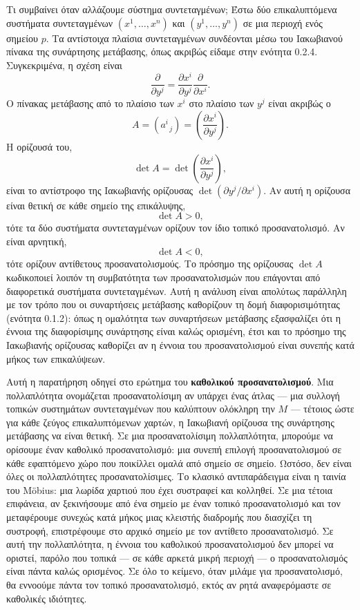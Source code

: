 \documentclass[12pt]{article}
\begin{document}
Τι συμβαίνει όταν αλλάζουμε σύστημα συντεταγμένων; Έστω δύο επικαλυπτόμενα συστήματα συντεταγμένων $(x^1, \dots, x^n)$ και $(y^1, \dots, y^n)$ σε μια περιοχή ενός σημείου $p$. Τα αντίστοιχα πλαίσια συντεταγμένων συνδέονται μέσω του Ιακωβιανού πίνακα της συνάρτησης μετάβασης, όπως ακριβώς είδαμε στην ενότητα 0.2.4. Συγκεκριμένα, η σχέση είναι
\[
\frac{\partial}{\partial y^j} = \frac{\partial x^i}{\partial y^j} \frac{\partial}{\partial x^i}.
\]
Ο πίνακας μετάβασης από το πλαίσιο των $x^i$ στο πλαίσιο των $y^j$ είναι ακριβώς ο
\[
A = (a^i_{\;\; j}) = \left( \frac{\partial x^i}{\partial y^j} \right).
\]
Η ορίζουσά του,
\[
\det A = \det \left( \frac{\partial x^i}{\partial y^j} \right),
\]
είναι το αντίστροφο της Ιακωβιανής ορίζουσας $\det(\partial y^j / \partial x^i)$. Αν αυτή η ορίζουσα είναι θετική σε κάθε σημείο της επικάλυψης,
\[
\det A > 0,
\]
τότε τα δύο συστήματα συντεταγμένων ορίζουν τον ίδιο τοπικό προσανατολισμό. Αν είναι αρνητική,
\[
\det A < 0,
\]
τότε ορίζουν αντίθετους προσανατολισμούς. Το πρόσημο της ορίζουσας $\det A$ κωδικοποιεί λοιπόν τη συμβατότητα των προσανατολισμών που επάγονται από διαφορετικά συστήματα συντεταγμένων. Αυτή η ανάλυση είναι απολύτως παράλληλη με τον τρόπο που οι συναρτήσεις μετάβασης καθορίζουν τη δομή διαφορισιμότητας (ενότητα 0.1.2): όπως η ομαλότητα των συναρτήσεων μετάβασης εξασφαλίζει ότι η έννοια της διαφορίσιμης συνάρτησης είναι καλώς ορισμένη, έτσι και το πρόσημο της Ιακωβιανής ορίζουσας καθορίζει αν η έννοια του προσανατολισμού είναι συνεπής κατά μήκος των επικαλύψεων.

Αυτή η παρατήρηση οδηγεί στο ερώτημα του \textbf{καθολικού προσανατολισμού}. Μια πολλαπλότητα ονομάζεται προσανατολίσιμη αν υπάρχει ένας άτλας --- μια συλλογή τοπικών συστημάτων συντεταγμένων που καλύπτουν ολόκληρη την $M$ --- τέτοιος ώστε για κάθε ζεύγος επικαλυπτόμενων χαρτών, η Ιακωβιανή ορίζουσα της συνάρτησης μετάβασης να είναι θετική. Σε μια προσανατολίσιμη πολλαπλότητα, μπορούμε να ορίσουμε έναν καθολικό προσανατολισμό: μια συνεπή επιλογή προσανατολισμού σε κάθε εφαπτόμενο χώρο που ποικίλλει ομαλά από σημείο σε σημείο. Ωστόσο, δεν είναι όλες οι πολλαπλότητες προσανατολίσιμες. Το κλασικό αντιπαράδειγμα είναι η ταινία του Möbius: μια λωρίδα χαρτιού που έχει συστραφεί και κολληθεί. Σε μια τέτοια επιφάνεια, αν ξεκινήσουμε από ένα σημείο με έναν τοπικό προσανατολισμό και τον μεταφέρουμε συνεχώς κατά μήκος μιας κλειστής διαδρομής που διασχίζει τη συστροφή, επιστρέφουμε στο αρχικό σημείο με τον αντίθετο προσανατολισμό. Σε αυτή την πολλαπλότητα, η έννοια του καθολικού προσανατολισμού δεν μπορεί να οριστεί, παρόλο που τοπικά --- σε κάθε αρκετά μικρή περιοχή --- ο προσανατολισμός είναι πάντα καλώς ορισμένος. Σε όλο το κείμενο, όταν μιλάμε για προσανατολισμό, θα εννοούμε πάντα τον τοπικό προσανατολισμό, εκτός αν ρητά αναφερόμαστε σε καθολικές ιδιότητες.
\end{document}
